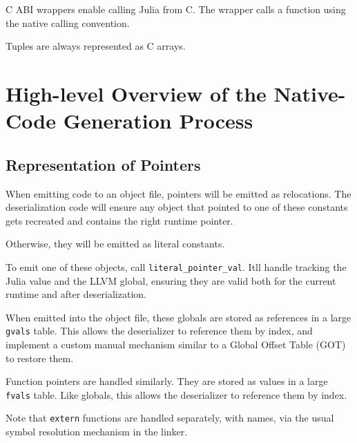 C ABI wrappers enable calling Julia from C. The wrapper calls a function using the native calling convention.



Tuples are always represented as C arrays.



\hypertarget{7542203617935209330}{}


\section{High-level Overview of the Native-Code Generation Process}



\hypertarget{6164157073495091365}{}


\subsection{Representation of Pointers}



When emitting code to an object file, pointers will be emitted as relocations. The deserialization code will ensure any object that pointed to one of these constants gets recreated and contains the right runtime pointer.



Otherwise, they will be emitted as literal constants.



To emit one of these objects, call \texttt{literal\_pointer\_val}. It{\textquotesingle}ll handle tracking the Julia value and the LLVM global, ensuring they are valid both for the current runtime and after deserialization.



When emitted into the object file, these globals are stored as references in a large \texttt{gvals} table. This allows the deserializer to reference them by index, and implement a custom manual mechanism similar to a Global Offset Table (GOT) to restore them.



Function pointers are handled similarly. They are stored as values in a large \texttt{fvals} table. Like globals, this allows the deserializer to reference them by index.



Note that \texttt{extern} functions are handled separately, with names, via the usual symbol resolution mechanism in the linker.



